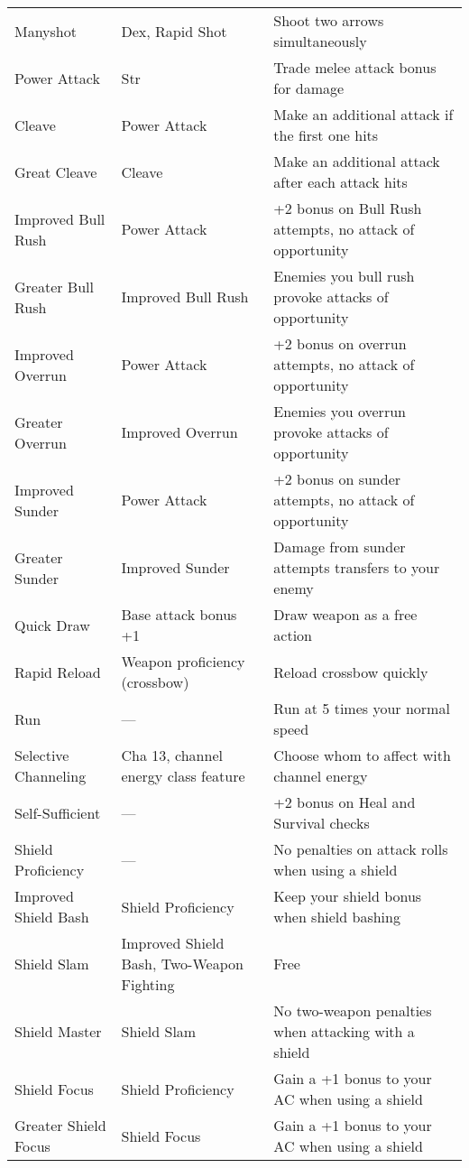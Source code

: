 \begin{table*}[]
\begin{tabularx}{\linewidth}{lXl}
\quad \quad Manyshot & Dex, Rapid Shot & Shoot two arrows simultaneously\\
Power Attack & Str & Trade melee attack bonus for damage\\
\quad Cleave & Power Attack & Make an additional attack if the first one hits\\
\quad \quad Great Cleave & Cleave & Make an additional attack after each attack hits\\
\quad Improved Bull Rush & Power Attack & +2 bonus on Bull Rush attempts, no attack of opportunity\\
\quad \quad Greater Bull Rush & Improved Bull Rush & Enemies you bull rush provoke attacks of opportunity\\
\quad Improved Overrun & Power Attack & +2 bonus on overrun attempts, no attack of opportunity\\
\quad \quad Greater Overrun & Improved Overrun & Enemies you overrun provoke attacks of opportunity \\
\quad Improved Sunder & Power Attack & +2 bonus on sunder attempts, no attack of opportunity\\
\quad \quad Greater Sunder & Improved Sunder & Damage from sunder attempts transfers to your enemy\\
Quick Draw & Base attack bonus +1 & Draw weapon as a free action\\
Rapid Reload & Weapon proficiency (crossbow) & Reload crossbow quickly\\
Run & --- & Run at 5 times your normal speed\\
Selective Channeling & Cha 13, channel energy class feature & Choose whom to affect with channel energy\\
Self-Sufficient & --- & +2 bonus on Heal and Survival checks\\
Shield Proficiency & --- & No penalties on attack rolls when using a shield\\
\quad Improved Shield Bash & Shield Proficiency & Keep your shield bonus when shield bashing\\
\quad \quad Shield Slam & Improved Shield Bash, Two-Weapon Fighting & Free \\
\quad \quad \quad Shield Master & Shield Slam & No two-weapon penalties when attacking with a shield\\
\quad Shield Focus & Shield Proficiency & Gain a +1 bonus to your AC when using a shield\\
\quad \quad Greater Shield Focus & Shield Focus & Gain a +1 bonus to your AC when using a shield\\

\end{tabularx}
\end{table*}
